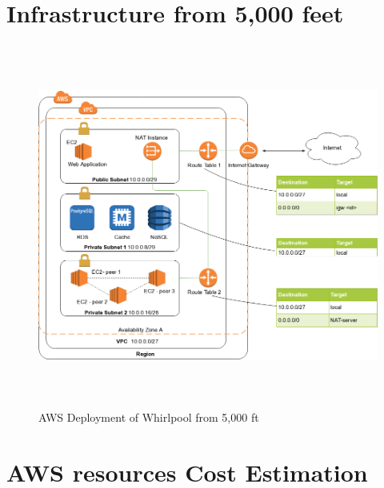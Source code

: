 
\section{Infrastructure from 5,000 feet}
\begin{figure}[h!]
  \centering
  \includegraphics[width=20cm,height=12cm,keepaspectratio]{../media/crawler/aws-deploy-5k-feet.png}
  \caption{AWS Deployment of Whirlpool from 5,000 ft}
\end{figure}

\section{AWS resources Cost Estimation}

\pagebreak